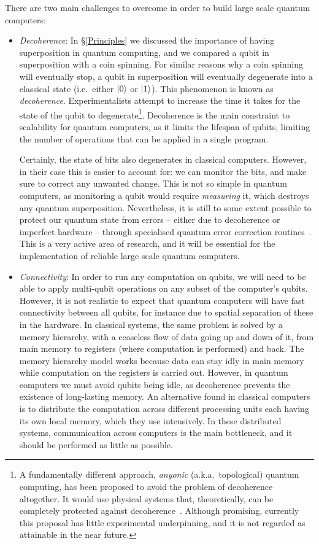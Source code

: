 There are two main challenges to overcome in order to build large scale quantum computers:

\begin{itemize}

\item \textit{Decoherence}: In \S\ref{Principles} we discussed the importance of having superposition in quantum computing, and we compared a qubit in superposition with a coin spinning. For similar reasons why a coin spinning will eventually stop, a qubit in superposition will eventually degenerate into a classical state (i.e.\ either \(\vert 0 \rangle\) or \(\vert 1 \rangle\)). This phenomenon is known as \textit{decoherence}. Experimentalists attempt to increase the time it takes for the state of the qubit to degenerate\footnote{A fundamentally different approach, \textit{anyonic} (a.k.a.\ topological) quantum computing, has been proposed to avoid the problem of decoherence altogether. It would use physical systems that, theoretically, can be completely protected against decoherence~\citep{Anyonic}. Although promising, currently this proposal has little experimental underpinning, and it is not regarded as attainable in the near future.}. Decoherence is the main constraint to scalability for quantum computers, as it limits the lifespan of qubits, limiting the number of operations that can be applied in a single program. 

Certainly, the state of bits also degenerates in classical computers. However, in their case this is easier to account for: we can monitor the bits, and make sure to correct any unwanted change. This is not so simple in quantum computers, as monitoring a qubit would require \textit{measuring} it, which destroys any quantum superposition. Nevertheless, it is still to some extent possible to protect our quantum state from errors -- either due to decoherence or imperfect hardware -- through specialised quantum error correction routines~\citep{QuantumErrorCorrection}. This is a very active area of research, and it will be essential for the implementation of reliable large scale quantum computers.


\item \textit{Connectivity}: In order to run any computation on qubits, we will need to be able to apply multi-qubit operations on any subset of the computer's qubits. However, it is not realistic to expect that quantum computers will have fast connectivity between all qubits, for instance due to spatial separation of these in the hardware. In classical systems, the same problem is solved by a memory hierarchy, with a ceaseless flow of data going up and down of it, from main memory to registers (where computation is performed) and back. The memory hierarchy model works because data can stay idly in main memory while computation on the registers is carried out. However, in quantum computers we must avoid qubits being idle, as decoherence prevents the existence of long-lasting memory. An alternative found in classical computers is to distribute the computation across different processing units each having its own local memory, which they use intensively. In these distributed systems, communication across computers is the main bottleneck, and it should be performed as little as possible.


\end{itemize}
